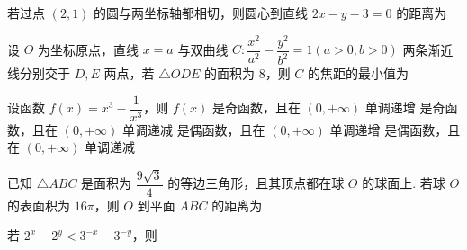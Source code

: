 \documentclass[a4paper,11pt]{report}
\begin{document}
\begin{examquestions}
\item 若过点 $(2,1)$ 的圆与两坐标轴都相切，则圆心到直线 $2x-y-3=0$ 的距离为
\fourchoices
{}
{}
{}
{}

\item 设 $O$ 为坐标原点，直线 $x=a$ 与双曲线 $C:\dfrac{x^2}{a^2}-\dfrac{y^2}{b^2}=1(a>0,b>0)$ 两条渐近线分别交于 $D,E$ 两点，若 $\triangle ODE$ 的面积为 $8$，则 $C$ 的焦距的最小值为

\item 设函数 $f(x)=x^3-\dfrac1{x^3}$，则 $f(x)$
\onechoices
{是奇函数，且在 $(0,+\infty)$ 单调递增}
{是奇函数，且在 $(0,+\infty)$ 单调递减}
{是偶函数，且在 $(0,+\infty)$ 单调递增}
{是偶函数，且在 $(0,+\infty)$ 单调递减}

\item 已知 $\triangle ABC$ 是面积为 $\dfrac{9\sqrt3}{4}$ 的等边三角形，且其顶点都在球 $O$ 的球面上. 若球 $O$ 的表面积为 $16\pi$，则 $O$ 到平面 $ABC$ 的距离为

\item 若 $2^x-2^y<3^{-x}-3^{-y}$，则

\end{examquestions}
\end{document}

